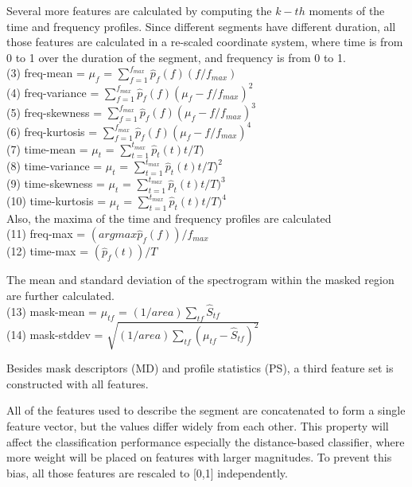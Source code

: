 Several more features are calculated by computing the $k-th$ moments of the time and frequency profiles. Since different segments have different duration, all those features are calculated in a re-scaled coordinate system, where time is from 0 to 1 over the duration of the segment, and frequency is from 0 to 1.
\\
(3) freq-mean = $\mu_{f}$ = $\sum_{f=1}^{f_{max}}\hat{p}_{f}(f)(f/f_{max})$
\\
(4) freq-variance = $\sum_{f=1}^{f_{max}}\hat{p}_{f}(f)(\mu_{f}-f/f_{max})^{2}$
\\
(5) freq-skewness = $\sum_{f=1}^{f_{max}}\hat{p}_{f}(f)(\mu_{f}-f/f_{max})^{3}$
\\
(6) freq-kurtosis = $\sum_{f=1}^{f_{max}}\hat{p}_{f}(f)(\mu_{f}-f/f_{max})^{4}$
\\
(7) time-mean =  $\mu_{t}$ = $\sum_{t=1}^{t_{max}}\hat{p}_{t}(t)t/T)$
\\
(8) time-variance = $\mu_{t}$ = $\sum_{t=1}^{t_{max}}\hat{p}_{t}(t)t/T)^{2}$
\\
(9) time-skewness = $\mu_{t}$ = $\sum_{t=1}^{t_{max}}\hat{p}_{t}(t)t/T)^{3}$
\\
(10) time-kurtosis = $\mu_{t}$ = $\sum_{t=1}^{t_{max}}\hat{p}_{t}(t)t/T)^{4}$
\\
Also, the maxima of the time and frequency profiles are calculated
\\
(11) freq-max = $(argmax \hat{p}_{f}(f)) / f_{max}$
\\
(12) time-max = $(\hat{p}_{f}(t)) / T$

The mean and standard deviation of the spectrogram within the masked region are further calculated.
\\
(13) mask-mean = $\mu_{tf}$ = $(1/area) \sum_{tf}\hat{S}_{tf}$
\\
(14) mask-stddev = $\sqrt{(1/area) \sum_{tf}(\mu_{tf}-\hat{S}_{tf})^{2}}$


Besides mask descriptors (MD) and profile statistics (PS), a third feature set is constructed with all features.

All of the features used to describe the segment are concatenated to form a single feature vector, but the values differ widely from each other. This property will affect the classification performance especially the distance-based classifier, where more weight will be placed on features with larger magnitudes. To prevent this bias, all those features are rescaled to [0,1] independently.



